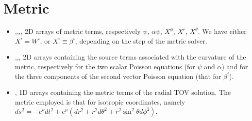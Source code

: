 \documentclass[letterpaper,10pt,english]{sphinxmanual}
\begin{document}
\section{Metric}
\label{\detokenize{arrays:metric}}\begin{itemize}
\item {} 
\sphinxAtStartPar
{},,,, \sphinxhyphen{} 2D arrays of metric terms, respectively \(\psi\), \(\alpha \psi\), \(X^{\phi}\), \(X^{r}\), \(X^{\theta}\). We have either \(X^i=W^i\), or \(X^i ≡ \beta ^i\), depending on the step of the metric solver.


\item {} 
\sphinxAtStartPar
{},,, \sphinxhyphen{} 2D arrays containing the source terms associated with the curvature
of the metric, respectively for the two scalar Poisson equations (for \(\psi\) and \(\alpha\)) and for the three
components of the second vector Poisson equation (that for \(\beta ^i\)).


\item {} 
\sphinxAtStartPar
{}, \sphinxhyphen{} 1D arrays containing the metric terms of the radial TOV solution. The metric employed is
that for isotropic coordinates, namely \(ds^2 = -e^\nu dt^2 + e^\mu (dr^2 + r^2 d\theta ^2 + r^2 \sin ^2 \theta d\phi ^2)\).

\end{itemize}
\end{document}
